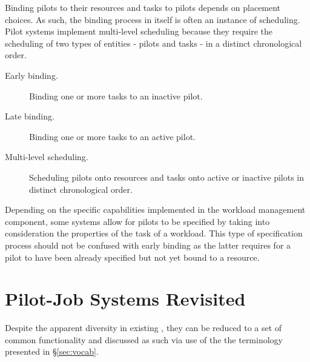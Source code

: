 \documentclass{sig-alternate}
\begin{document}
Binding pilots to their resources and tasks to pilots depends on placement 
choices. As such, the binding process in itself is often an instance of 
scheduling. Pilot systems implement multi-level scheduling because they require
the scheduling of two types of entities - pilots and tasks - in a distinct
chronological order.

\begin{description}

\item[Early binding.] Binding one or more tasks to an inactive pilot.

\item[Late binding.] Binding one or more tasks to an active pilot.

\item[Multi-level scheduling.] Scheduling pilots onto resources and tasks onto
active or inactive pilots in distinct chronological order.

\end{description}

Depending on the specific capabilities implemented in the workload management
component, some \pilotjob systems allow for pilots to be specified by taking
into consideration the properties of the task of a workload. This type of
specification process should not be confused with early binding as the latter
requires for a pilot to have been already specified but not yet bound to a
resource.

\section{Pilot-Job Systems Revisited}\label{sec:4}

Despite the apparent diversity in existing \pilotjobs,
they can be reduced to a set of common functionality and
discussed as such via use of the the terminology presented
in \S\ref{sec:vocab}.
\end{document}
